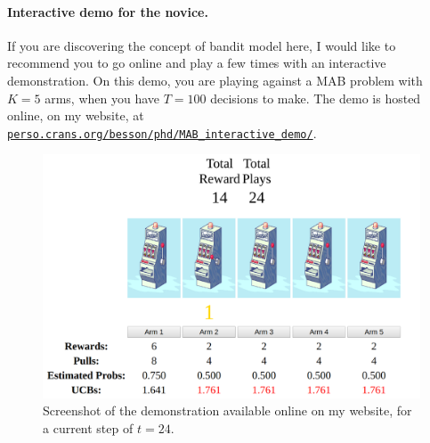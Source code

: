 \paragraph{Interactive demo for the novice.}
%
If you are discovering the concept of bandit model here, I would like to recommend you to go online and play a few times with an interactive demonstration.
On this demo, you are playing against a MAB problem with $K=5$ arms, when you have $T=100$ decisions to make.
The demo is hosted online, on my website, at \href{https://perso.crans.org/besson/phd/MAB\_interactive\_demo/}{\texttt{perso.crans.org/besson/phd/MAB\_interactive\_demo/}}.


\begin{figure}[h!]  %
    \centering
    \includegraphics[width=0.85\linewidth]{2-Chapters/2-Chapter/Images/example_of_a_5_arm_bandit_problem.png}
    \caption{Screenshot of the demonstration available online on my website, for a current step of $t=24$.}
    \label{fig:2:example_of_a_5_arm_bandit_problem}
\end{figure}


